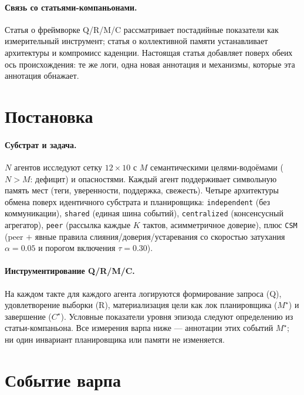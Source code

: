 \documentclass{article}
\newcommand{\method}[1]{\texttt{#1}}
\newcommand{\mstar}{M^{\star}}
\newcommand{\cstar}{C^{\star}}
\begin{document}
\paragraph{Связь со статьями-компаньонами.}
Статья о фреймворке Q/R/M/C рассматривает постадийные показатели как
измерительный инструмент; статья о коллективной памяти устанавливает
архитектуры и компромисс каденции. Настоящая статья добавляет поверх
обеих ось происхождения: те же логи, одна новая аннотация и
механизмы, которые эта аннотация обнажает. %

\section{Постановка}
\label{p2:sec:setting}

\paragraph{Субстрат и задача.} $N$ агентов исследуют сетку
$12\times10$ с $M$ семантическими целями-водоёмами ($N>M$: дефицит) и
опасностями. Каждый агент поддерживает символьную память мест (теги,
уверенности, поддержка, свежесть). Четыре архитектуры обмена поверх
идентичного субстрата и планировщика: \method{independent} (без
коммуникации), \method{shared} (единая шина событий),
\method{centralized} (консенсусный агрегатор), \method{peer}
(рассылка каждые $K$ тактов, асимметричное доверие), плюс
\method{CSM} (peer $+$ явные правила слияния/доверия/устаревания со
скоростью затухания $\alpha{=}0.05$ и порогом включения
$\tau{=}0.30$). %

\paragraph{Инструментирование Q/R/M/C.} На каждом такте для каждого
агента логируются формирование запроса (Q), удовлетворение выборки
(R), материализация цели как лок планировщика ($\mstar$) и завершение
($\cstar$). Условные показатели уровня эпизода следуют определению из
статьи-компаньона. Все измерения варпа ниже --- аннотации этих
событий $\mstar$; ни один инвариант планировщика или памяти не
изменяется.

\section{Событие варпа}
\label{p2:sec:warp-def}
\end{document}
